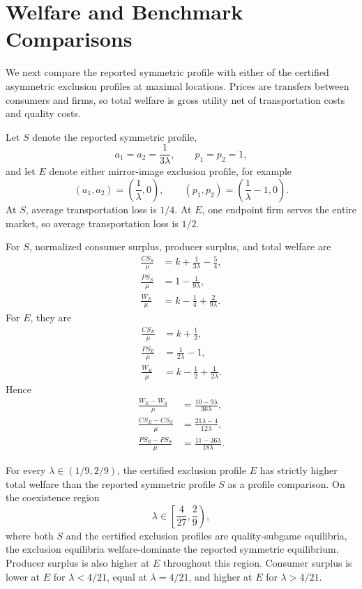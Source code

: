\section{Welfare and Benchmark Comparisons}\label{sec:welfare}

We next compare the reported symmetric profile with either of the certified asymmetric exclusion profiles at maximal locations. Prices are transfers between consumers and firms, so total welfare is gross utility net of transportation costs and quality costs.

Let $S$ denote the reported symmetric profile,
\[
 a_1=a_2=\frac1{3\lambda},\qquad p_1=p_2=1,
\]
and let $E$ denote either mirror-image exclusion profile, for example
\[
 (a_1,a_2)=\left(\frac1\lambda,0\right),
 \qquad
 (p_1,p_2)=\left(\frac1\lambda-1,0\right).
\]
At $S$, average transportation loss is $1/4$. At $E$, one endpoint firm serves the entire market, so average transportation loss is $1/2$.

For $S$, normalized consumer surplus, producer surplus, and total welfare are
\begin{align}
 \frac{CS_S}{\mu}&=k+\frac1{3\lambda}-\frac54,\label{eq:csS}\\
 \frac{PS_S}{\mu}&=1-\frac1{9\lambda},\label{eq:psS}\\
 \frac{W_S}{\mu}&=k-\frac14+\frac{2}{9\lambda}.\label{eq:wS}
\end{align}
For $E$, they are
\begin{align}
 \frac{CS_E}{\mu}&=k+\frac12,\label{eq:csE}\\
 \frac{PS_E}{\mu}&=\frac1{2\lambda}-1,\label{eq:psE}\\
 \frac{W_E}{\mu}&=k-\frac12+\frac1{2\lambda}.\label{eq:wE}
\end{align}
Hence
\begin{align}
 \frac{W_E-W_S}{\mu}&=\frac{10-9\lambda}{36\lambda},\label{eq:wdiff}\\
 \frac{CS_E-CS_S}{\mu}&=\frac{21\lambda-4}{12\lambda},\label{eq:csdiff}\\
 \frac{PS_E-PS_S}{\mu}&=\frac{11-36\lambda}{18\lambda}.\label{eq:psdiff}
\end{align}

\begin{proposition}\label{prop:welfare}
For every $\lambda\in(1/9,2/9)$, the certified exclusion profile $E$ has strictly higher total welfare than the reported symmetric profile $S$ as a profile comparison. On the coexistence region
\[
 \lambda\in\left[\frac4{27},\frac29\right),
\]
where both $S$ and the certified exclusion profiles are quality-subgame equilibria, the exclusion equilibria welfare-dominate the reported symmetric equilibrium. Producer surplus is also higher at $E$ throughout this region. Consumer surplus is lower at $E$ for $\lambda<4/21$, equal at $\lambda=4/21$, and higher at $E$ for $\lambda>4/21$.
\end{proposition}

